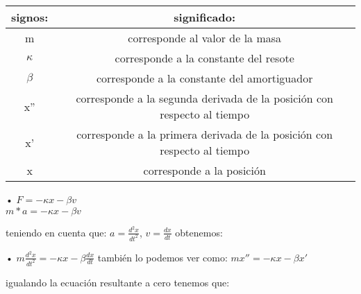 \documentclass[12pt,a4paper]{article}
\begin{document}
\begin{tabular}{|c|c|}\hline

\textbf{signos:}      & \textbf{significado:}\\ \hline

m              &  corresponde al valor de la masa \\ \hline

$\kappa$  &  corresponde a la constante del resote\\ \hline

$\beta$ &  corresponde a la constante del amortiguador\\ \hline

x'' &  corresponde a la segunda derivada de la posición con respecto al tiempo\\ \hline

x' & corresponde a la primera derivada de la posición con respecto al tiempo\\ \hline

x  &  corresponde a la posición\\ \hline



\end{tabular}

\vspace{0.6cm}

•
${F=-\kappa x -\beta v}$\\

${m*a=-\kappa x -\beta v}$\\


\vspace{0.6cm}

teniendo en cuenta que: \hspace{0.8cm}
$a=\frac{d^2x}{dt^2}$, \hspace{0.8cm} $v={\frac{dx}{dt}}$\hspace{0.6cm} obtenemos:\\
\vspace{0.6cm}

•
{$m{\frac{d^2x}{dt^2}} = -\kappa x -\beta{\frac{dx}{dt}}$}  \hspace{0.8cm}  también lo podemos ver como: \hspace{1cm} $mx'' = -\kappa x - \beta x'$ \\
  
\vspace{0.3cm}

 igualando la ecuación resultante a cero tenemos que:\\
 
\end{document}
